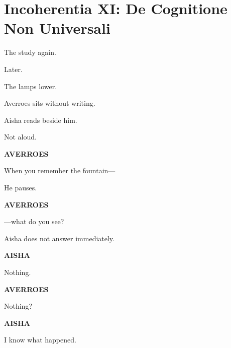 
\chapter*{Incoherentia XI: De Cognitione Non Universali}


The study again.

Later.

The lamps lower.

\medskip

Averroes sits without writing.

\medskip

Aisha reads beside him.

\medskip

Not aloud.

\medskip

\textbf{AVERROES}

When you remember the fountain---

\medskip

He pauses.

\medskip

\textbf{AVERROES}

---what do you see?

\medskip

Aisha does not answer immediately.

\medskip

\textbf{AISHA}

Nothing.

\medskip

\textbf{AVERROES}

Nothing?

\medskip

\textbf{AISHA}

I know what happened.

